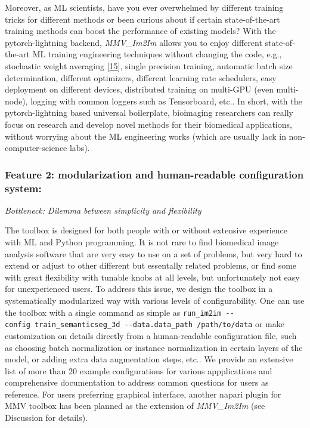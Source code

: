 Moreover, as ML scientists, have you ever overwhelmed by different training tricks for different methods or been curious about if certain state-of-the-art training methods can boost the performance of existing models? With the pytorch-lightning backend, \emph{MMV\_Im2Im} allows you to enjoy different state-of-the-art ML training engineering techniques without changing the code, e.g., stochastic weight averaging {[}\protect\hyperlink{ref-qzeQFRn9}{15}{]}, single precision training, automatic batch size determination, different optimizers, different learning rate schedulers, easy deployment on different devices, distributed training on multi-GPU (even multi-node), logging with common loggers such as Tensorboard, etc.. In short, with the pytorch-lightning based universal boilerplate, bioimaging researchers can really focus on research and develop novel methods for their biomedical applications, without worrying about the ML engineering works (which are usually lack in non-computer-science labs).

\hypertarget{feature-2-modularization-and-human-readable-configuration-system}{%
\subsubsection{Feature 2: modularization and human-readable configuration system:}\label{feature-2-modularization-and-human-readable-configuration-system}}

\emph{Bottleneck: Dilemma between simplicity and flexibility}

The toolbox is designed for both people with or without extensive experience with ML and Python programming. It is not rare to find biomedical image analysis software that are very easy to use on a set of problems, but very hard to extend or adjust to other different but essentally related problems, or find some with great flexibility with tunable knobs at all levels, but unfortunately not easy for unexperienced users. To address this issue, we design the toolbox in a systematically modularized way with various levels of configurability. One can use the toolbox with a single command as simple as \texttt{run\_im2im\ -\/-config\ train\_semanticseg\_3d\ -\/-data.data\_path\ /path/to/data} or make customization on details directly from a human-readable configuration file, such as choosing batch normalization or instance normalization in certain layers of the model, or adding extra data augmentation steps, etc.. We provide an extensive list of more than 20 example configurations for various appplications and comprehensive documentation to address common questions for users as reference. For users preferring graphical interface, another napari plugin for MMV toolbox has been planned as the extension of \emph{MMV\_Im2Im} (see Discussion for details).

